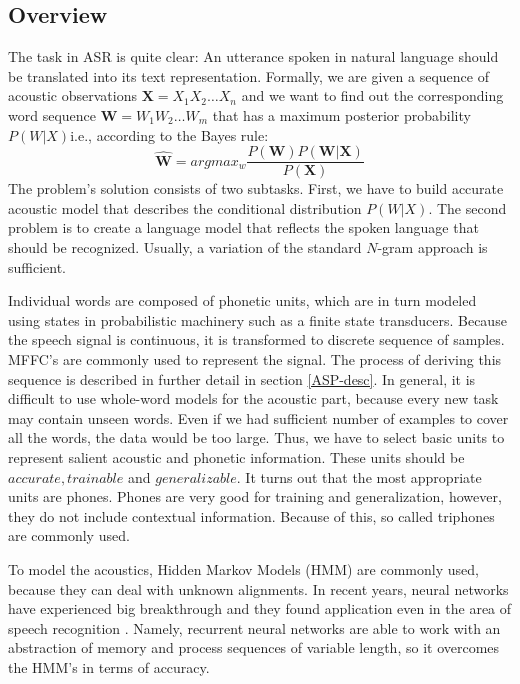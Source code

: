 \subsection*{Overview}
The task in ASR is quite clear: An utterance spoken in natural language should be translated into its text representation.
Formally, we are given a sequence of acoustic observations $\textbf{X} = X_1X_2\dots X_n$ and we want to find out the corresponding word sequence $\textbf{W} = W_1W_2\dots W_m$ that has a maximum posterior probability $P(W | X)$i.e., according to the Bayes rule:
\begin{equation}
\hat{\textbf{W}} = argmax_w \frac{P(\textbf{W})P(\textbf{W}|\textbf{X})}{P(\textbf{X})}
\end{equation}
The problem's solution consists of two subtasks.
First, we have to build accurate acoustic model that describes the conditional distribution $P(W|X)$.
The second problem is to create a language model that reflects the spoken language that should be recognized.
Usually, a variation of the standard $N$-gram approach is sufficient.
\par
Individual words are composed of phonetic units, which are in turn modeled using states in probabilistic machinery such as a finite state transducers.
Because the speech signal is continuous, it is transformed to discrete sequence of samples.
MFFC's are commonly used to represent the signal.
The process of deriving this sequence is described in further detail in section \ref{ASP-desc}.
In general, it is difficult to use whole-word models for the acoustic part, because every new task may contain unseen words.
Even if we had sufficient number of examples to cover all the words, the data would be too large.
Thus, we have to select basic units to represent salient acoustic and phonetic information.
These units should be $accurate, trainable$ and $generalizable$.
It turns out that the most appropriate units are phones.
Phones are very good for training and generalization, however, they do not include contextual information.
Because of this, so called triphones are commonly used.
\par
To model the acoustics, Hidden Markov Models (HMM) are commonly used, because they can deal with unknown alignments.
In recent years, neural networks have experienced big breakthrough and they found application even in the area of speech recognition \cite{hinton2012deep}.
Namely, recurrent neural networks are able to work with an abstraction of memory and process sequences of variable length, so it overcomes the HMM's in terms of accuracy.
